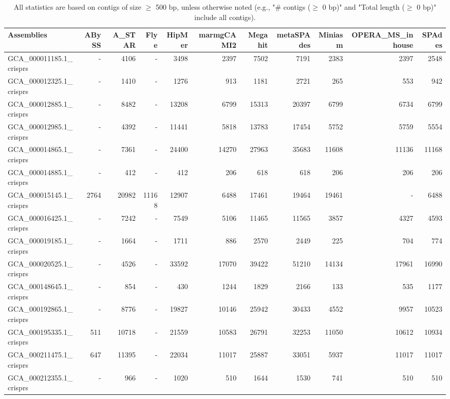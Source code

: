 \documentclass[12pt,a4paper]{article}
\begin{document}
\begin{table}[ht]
\begin{center}
\caption{All statistics are based on contigs of size $\geq$ 500 bp, unless otherwise noted (e.g., "\# contigs ($\geq$ 0 bp)" and "Total length ($\geq$ 0 bp)" include all contigs).}
\begin{tabular}{|l*{10}{|r}|}
\hline
Assemblies & ABySS & A\_STAR & Flye & HipMer & marmgCAMI2 & Megahit & metaSPAdes & Miniasm & OPERA\_MS\_inhouse & SPAdes \\ \hline
GCA\_000011185.1\_crisprs & - & 4106 & - & 3498 & 2397 & 7502 & 7191 & 2383 & 2397 & 2548 \\ \hline
GCA\_000012325.1\_crisprs & - & 1410 & - & 1276 & 913 & 1181 & 2721 & 265 & 553 & 942 \\ \hline
GCA\_000012885.1\_crisprs & - & 8482 & - & 13208 & 6799 & 15313 & 20397 & 6799 & 6734 & 6799 \\ \hline
GCA\_000012985.1\_crisprs & - & 4392 & - & 11441 & 5818 & 13783 & 17454 & 5752 & 5759 & 5554 \\ \hline
GCA\_000014865.1\_crisprs & - & 7361 & - & 24400 & 14270 & 27963 & 35683 & 11608 & 11136 & 11168 \\ \hline
GCA\_000014885.1\_crisprs & - & 412 & - & 412 & 206 & 618 & 618 & 206 & 206 & 206 \\ \hline
GCA\_000015145.1\_crisprs & 2764 & 20982 & 11168 & 12907 & 6488 & 17461 & 19464 & 19461 & - & 6488 \\ \hline
GCA\_000016425.1\_crisprs & - & 7242 & - & 7549 & 5106 & 11465 & 11565 & 3857 & 4327 & 4593 \\ \hline
GCA\_000019185.1\_crisprs & - & 1664 & - & 1711 & 886 & 2570 & 2449 & 225 & 704 & 774 \\ \hline
GCA\_000020525.1\_crisprs & - & 4526 & - & 33592 & 17070 & 39422 & 51210 & 14134 & 17961 & 16990 \\ \hline
GCA\_000148645.1\_crisprs & - & 854 & - & 430 & 1244 & 1829 & 2166 & 133 & 535 & 1177 \\ \hline
GCA\_000192865.1\_crisprs & - & 8776 & - & 19827 & 10146 & 25942 & 30433 & 4552 & 9957 & 10523 \\ \hline
GCA\_000195335.1\_crisprs & 511 & 10718 & - & 21559 & 10583 & 26791 & 32253 & 11050 & 10612 & 10934 \\ \hline
GCA\_000211475.1\_crisprs & 647 & 11395 & - & 22034 & 11017 & 25887 & 33051 & 5937 & 11017 & 11017 \\ \hline
GCA\_000212355.1\_crisprs & - & 966 & - & 1020 & 510 & 1644 & 1530 & 741 & 510 & 510 \\ \hline

\end{tabular}
\end{center}
\end{table}
\end{document}
